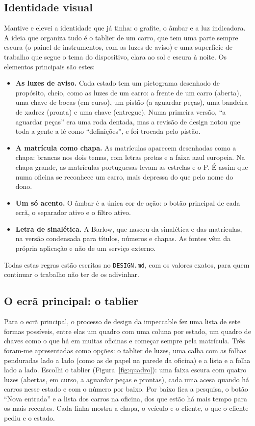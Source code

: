 \documentclass[a4paper,12pt]{article}
\begin{document}
\subsection{Identidade visual}

Mantive e elevei a identidade que já tinha: o grafite, o âmbar e a luz indicadora. A ideia que organiza tudo é o tablier de um carro, que tem uma parte sempre escura (o painel de instrumentos, com as luzes de aviso) e uma superfície de trabalho que segue o tema do dispositivo, clara ao sol e escura à noite. Os elementos principais são estes:
\begin{itemize}
    \item \textbf{As luzes de aviso.} Cada estado tem um pictograma desenhado de propósito, cheio, como as luzes de um carro: a frente de um carro (aberta), uma chave de bocas (em curso), um pistão (a aguardar peças), uma bandeira de xadrez (pronta) e uma chave (entregue). Numa primeira versão, ``a aguardar peças'' era uma roda dentada, mas a revisão de design notou que toda a gente a lê como ``definições'', e foi trocada pelo pistão.
    \item \textbf{A matrícula como chapa.} As matrículas aparecem desenhadas como a chapa: brancas nos dois temas, com letras pretas e a faixa azul europeia. Na chapa grande, as matrículas portuguesas levam as estrelas e o P. É assim que numa oficina se reconhece um carro, mais depressa do que pelo nome do dono.
    \item \textbf{Um só acento.} O âmbar é a única cor de ação: o botão principal de cada ecrã, o separador ativo e o filtro ativo.
    \item \textbf{Letra de sinalética.} A Barlow, que nasceu da sinalética e das matrículas, na versão condensada para títulos, números e chapas. As fontes vêm da própria aplicação e não de um serviço externo.
\end{itemize}

Todas estas regras estão escritas no \texttt{DESIGN.md}, com os valores exatos, para quem continuar o trabalho não ter de os adivinhar.

\subsection{O ecrã principal: o tablier}

Para o ecrã principal, o processo de design da impeccable fez uma lista de sete formas possíveis, entre elas um quadro com uma coluna por estado, um quadro de chaves como o que há em muitas oficinas e começar sempre pela matrícula. Três foram-me apresentadas como opções: o tablier de luzes, uma calha com as folhas penduradas lado a lado (como as de papel na parede da oficina) e a lista e a folha lado a lado. Escolhi o tablier (Figura~\ref{fig:quadro}): uma faixa escura com quatro luzes (abertas, em curso, a aguardar peças e prontas), cada uma acesa quando há carros nesse estado e com o número por baixo. Por baixo fica a pesquisa, o botão ``Nova entrada'' e a lista dos carros na oficina, dos que estão há mais tempo para os mais recentes. Cada linha mostra a chapa, o veículo e o cliente, o que o cliente pediu e o estado.
\end{document}
